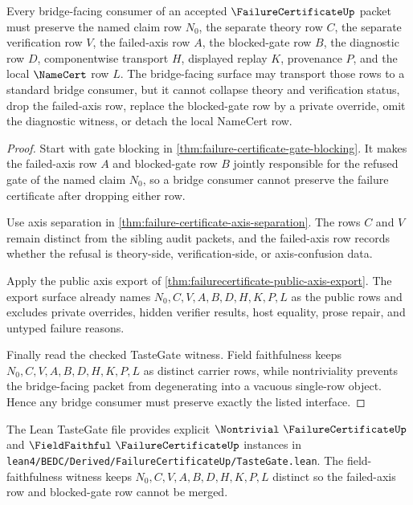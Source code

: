 \begin{theorem}
\label{thm:failurecertificate-bridged-interface}
Every bridge-facing consumer of an accepted $\FailureCertificateUp$ packet must preserve the named claim row $N_0$, the separate theory row $C$, the separate verification row $V$, the failed-axis row $A$, the blocked-gate row $B$, the diagnostic row $D$, componentwise transport $H$, displayed replay $K$, provenance $P$, and the local $\NameCert$ row $L$. The bridge-facing surface may transport those rows to a standard bridge consumer, but it cannot collapse theory and verification status, drop the failed-axis row, replace the blocked-gate row by a private override, omit the diagnostic witness, or detach the local NameCert row.
\end{theorem}
\begin{proof}
Start with gate blocking in \autoref{thm:failure-certificate-gate-blocking}. It makes the failed-axis row $A$ and blocked-gate row $B$ jointly responsible for the refused gate of the named claim $N_0$, so a bridge consumer cannot preserve the failure certificate after dropping either row.

Use axis separation in \autoref{thm:failure-certificate-axis-separation}. The rows $C$ and $V$ remain distinct from the sibling audit packets, and the failed-axis row records whether the refusal is theory-side, verification-side, or axis-confusion data.

Apply the public axis export of \autoref{thm:failurecertificate-public-axis-export}. The export surface already names $N_0,C,V,A,B,D,H,K,P,L$ as the public rows and excludes private overrides, hidden verifier results, host equality, prose repair, and untyped failure reasons.

Finally read the checked TasteGate witness. Field faithfulness keeps $N_0,C,V,A,B,D,H,K,P,L$ as distinct carrier rows, while nontriviality prevents the bridge-facing packet from degenerating into a vacuous single-row object. Hence any bridge consumer must preserve exactly the listed interface.
\end{proof}

The Lean TasteGate file provides explicit $\Nontrivial\ \FailureCertificateUp$ and $\FieldFaithful\ \FailureCertificateUp$ instances in \texttt{lean4/BEDC/Derived/FailureCertificateUp/TasteGate.lean}. The field-faithfulness witness keeps $N_0,C,V,A,B,D,H,K,P,L$ distinct so the failed-axis row and blocked-gate row cannot be merged.

